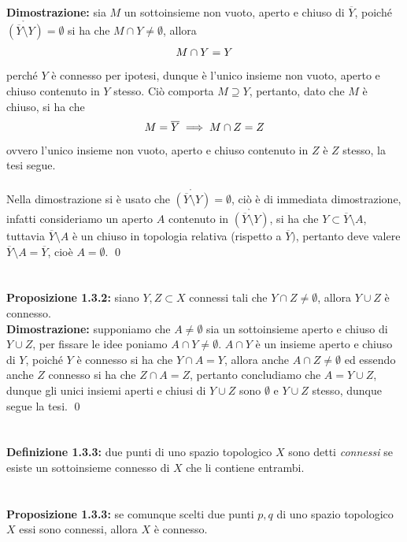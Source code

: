 \documentclass{article}
\begin{document}
\textbf{Dimostrazione:} sia $M$ un sottoinsieme non vuoto, aperto e chiuso di $\overline{Y}$, poiché $\mathring{(\overline{Y} \setminus Y)} = \emptyset$ si ha che $M \cap Y \neq \emptyset$, allora
\begin{gather}
    M \cap Y = Y \notag
\end{gather}
perché $Y$ è connesso per ipotesi, dunque è l'unico insieme non vuoto, aperto e chiuso contenuto in $Y$ stesso. Ciò comporta $M \supseteq Y$, pertanto, dato che $M$ è chiuso, si ha che
\begin{gather}
    M = \overline{Y} \implies M \cap Z = Z \notag
\end{gather}
ovvero l'unico insieme non vuoto, aperto e chiuso contenuto in $Z$ è $Z$ stesso, la tesi segue. \\ \\
Nella dimostrazione si è usato che $\mathring{(\overline{Y} \setminus Y)} = \emptyset$, ciò è di immediata dimostrazione, infatti consideriamo un aperto $A$ contenuto in $\mathring{(\overline{Y} \setminus Y)}$, si ha che $Y \subset \overline{Y} \setminus A$, tuttavia $\overline{Y} \setminus A$ è un chiuso in topologia relativa (rispetto a $\overline{Y})$, pertanto deve valere $\overline{Y} \setminus A = \overline{Y}$, cioè $A = \emptyset$. \qed \\ \\ \\
\textbf{Proposizione 1.3.2:} siano $Y, Z \subset X$ connessi tali che $Y \cap Z \neq \emptyset$, allora $Y \cup Z$ è connesso. \\

\textbf{Dimostrazione:} supponiamo che $A \neq \emptyset$ sia un sottoinsieme aperto e chiuso di $Y \cup Z$, per fissare le idee poniamo $A \cap Y \neq \emptyset$. $A \cap Y$ è un insieme aperto e chiuso di $Y$, poiché $Y$ è connesso si ha che $Y \cap A = Y$, allora anche $A \cap Z \neq \emptyset$ ed essendo anche $Z$ connesso si ha che $Z \cap A = Z$, pertanto concludiamo che $A = Y \cup Z$, dunque gli unici insiemi aperti e chiusi di $Y \cup Z$ sono $\emptyset$ e $Y \cup Z$ stesso, dunque segue la tesi. \qed \\ \\ \\
\textbf{Definizione 1.3.3:} due punti di uno spazio topologico $X$ sono detti \textit{connessi} se esiste un sottoinsieme connesso di $X$ che li contiene entrambi. \\ \\ \\
\textbf{Proposizione 1.3.3:} se comunque scelti due punti $p, q$ di uno spazio topologico $X$ essi sono connessi, allora $X$ è connesso. \\
\end{document}
